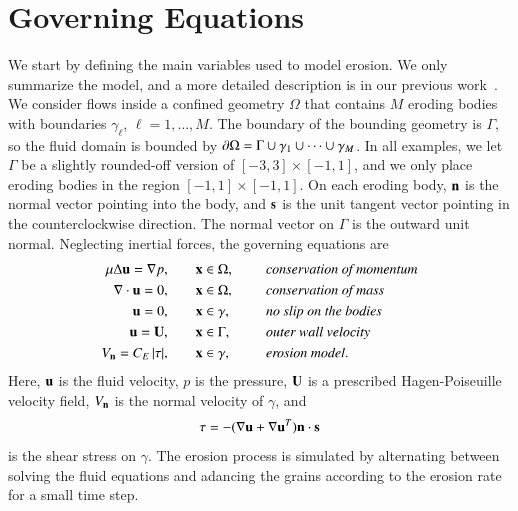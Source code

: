 \documentclass[preprint,10pt]{elsarticle}
\begin{document}
\section{Governing Equations}
\label{sec:formulation}
We start by defining the main variables used to model erosion.  We only
summarize the model, and a more detailed description is in our previous
work~\cite{qua-moo2018}.  We consider flows inside a confined geometry
$\Omega$ that contains $M$ eroding bodies with boundaries $\gamma_\ell$,
$\ell = 1,\ldots,M$.  The boundary of the bounding geometry is $\Gamma$,
so the fluid domain is bounded by $\bd \Omega = \Gamma \cup \gamma_1
\cup \cdots \cup \gamma_M$.  In all examples, we let $\Gamma$ be a
slightly rounded-off version of $[-3,3] \times [-1,1]$, and we only
place eroding bodies in the region $[-1,1] \times [-1,1]$.  On each
eroding body, $\nn$ is the normal vector pointing into the body, and
$\ss$ is the unit tangent vector pointing in the counterclockwise
direction.  The normal vector on $\Gamma$ is the outward unit normal.
Neglecting inertial forces, the governing equations are
\begin{equation}
\label{eqn:erosionModel}
  \begin{split}
    \mu \Delta \uu = \grad p, &\hspace{20pt} \xx \in \Omega, \gap 
      &&\mbox{\em conservation of momentum}\\
    \grad \cdot \uu = 0, &\hspace{20pt} \xx \in \Omega, \gap 
      &&\mbox{\em conservation of mass} \\
    \uu = 0, &\hspace{20pt} \xx \in \gamma, \gap 
      &&\mbox{\em no slip on the bodies} \\
    \uu = \UU, &\hspace{20pt} \xx \in \Gamma, \gap 
      &&\mbox{\em outer wall velocity} \\
    \Vn = \CE \, \abs{\tau}, &\hspace{20pt} \xx \in \gamma,
      &&\mbox{\em erosion model}.
  \end{split}
\end{equation}
Here, $\uu$ is the fluid velocity, $p$ is the pressure, $\UU$ is a
prescribed Hagen-Poiseuille velocity field, $\Vn$ is the normal velocity
of $\gamma$, and
\begin{align}
  \tau = -(\nabla \uu + \nabla \uu^T) \nn \cdot \ss
  \label{eqn:shearStress}
\end{align}
is the shear stress on $\gamma$.  The erosion process is simulated by
alternating between solving the fluid equations and adancing the grains
according to the erosion rate for a small time step.
\end{document}
